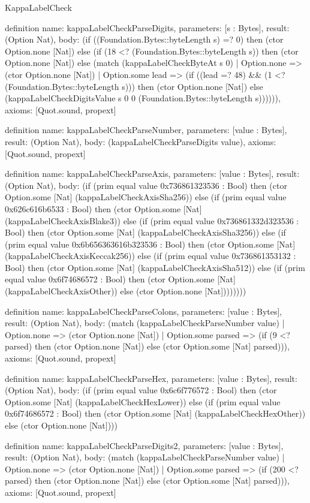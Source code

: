 \begin{lexlean}{KappaLabelCheck}
\begin{semanticmodule}
definition{
  name: kappaLabelCheckParseDigits,
  parameters: [s : Bytes],
  result: (Option Nat),
  body: (if ((Foundation.Bytes::byteLength s) =? 0) then (ctor Option.none [Nat]) else (if (18 <? (Foundation.Bytes::byteLength s)) then (ctor Option.none [Nat]) else (match (kappaLabelCheckByteAt s 0)
    | Option.none => (ctor Option.none [Nat])
    | Option.some lead => (if ((lead =? 48) && (1 <? (Foundation.Bytes::byteLength s))) then (ctor Option.none [Nat]) else (kappaLabelCheckDigitsValue s 0 0 (Foundation.Bytes::byteLength s)))))),
  axioms: [Quot.sound, propext]
}

definition{
  name: kappaLabelCheckParseNumber,
  parameters: [value : Bytes],
  result: (Option Nat),
  body: (kappaLabelCheckParseDigits value),
  axioms: [Quot.sound, propext]
}

definition{
  name: kappaLabelCheckParseAxis,
  parameters: [value : Bytes],
  result: (Option Nat),
  body: (if (prim equal value 0x736861323536 : Bool) then (ctor Option.some [Nat] (kappaLabelCheckAxisSha256)) else (if (prim equal value 0x626c616b6533 : Bool) then (ctor Option.some [Nat] (kappaLabelCheckAxisBlake3)) else (if (prim equal value 0x736861332d323536 : Bool) then (ctor Option.some [Nat] (kappaLabelCheckAxisSha3256)) else (if (prim equal value 0x6b656363616b323536 : Bool) then (ctor Option.some [Nat] (kappaLabelCheckAxisKeccak256)) else (if (prim equal value 0x736861353132 : Bool) then (ctor Option.some [Nat] (kappaLabelCheckAxisSha512)) else (if (prim equal value 0x6f74686572 : Bool) then (ctor Option.some [Nat] (kappaLabelCheckAxisOther)) else (ctor Option.none [Nat])))))))
}

definition{
  name: kappaLabelCheckParseColons,
  parameters: [value : Bytes],
  result: (Option Nat),
  body: (match (kappaLabelCheckParseNumber value)
    | Option.none => (ctor Option.none [Nat])
    | Option.some parsed => (if (9 <? parsed) then (ctor Option.none [Nat]) else (ctor Option.some [Nat] parsed))),
  axioms: [Quot.sound, propext]
}

definition{
  name: kappaLabelCheckParseHex,
  parameters: [value : Bytes],
  result: (Option Nat),
  body: (if (prim equal value 0x6c6f776572 : Bool) then (ctor Option.some [Nat] (kappaLabelCheckHexLower)) else (if (prim equal value 0x6f74686572 : Bool) then (ctor Option.some [Nat] (kappaLabelCheckHexOther)) else (ctor Option.none [Nat])))
}

definition{
  name: kappaLabelCheckParseDigits2,
  parameters: [value : Bytes],
  result: (Option Nat),
  body: (match (kappaLabelCheckParseNumber value)
    | Option.none => (ctor Option.none [Nat])
    | Option.some parsed => (if (200 <? parsed) then (ctor Option.none [Nat]) else (ctor Option.some [Nat] parsed))),
  axioms: [Quot.sound, propext]
}


\end{semanticmodule}
\end{lexlean}
